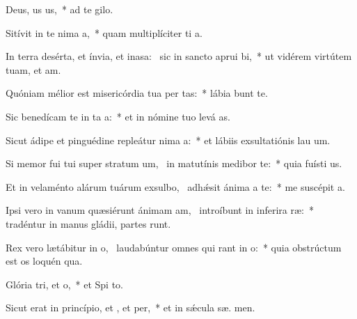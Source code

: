 \item Deus, us us,~* ad te   gilo.
\item Sitívit in te nima a,~* quam multiplíciter ti  a.
\item In terra desérta, et ínvia, et inasa:~\pscross{} sic in sancto aprui bi,~* ut vidérem virtútem tuam, et  am.
\item Quóniam mélior est misericórdia tua per tas:~* lábia  bunt te.
\item Sic benedícam te in ta a:~* et in nómine tuo levá  as.
\item Sicut ádipe et pinguédine repleátur nima a:~* et lábiis exsultatiónis lau  um.
\item Si memor fui tui super stratum um,~\pscross{} in matutínis medibor  te:~* quia fuísti  us.
\item Et in velaménto alárum tuárum exsulbo,~\pscross{} adhǽsit ánima a  te:~* me suscépit  a.
\item Ipsi vero in vanum quæsiérunt ánimam am,~\pscross{} introíbunt in inferira ræ:~* tradéntur in manus gládii, partes  runt.
\item Rex vero lætábitur in o,~\pscross{} laudabúntur omnes qui rant in o:~* quia obstrúctum est os loquén qua.
\item Glória tri, et o,~* et Spi to.
\item Sicut erat in princípio, et , et per,~* et in sǽcula sæ. men.

